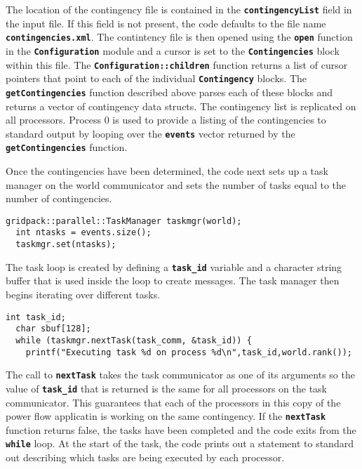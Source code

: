 The location of the contingency file is contained in the
\texttt{\textbf{contingencyList}} field in the input file. If this field is not
present, the code defaults to the file name \texttt{\textbf{contingencies.xml}}.
The contintency file is then opened using the \texttt{\textbf{open}} function in
the \texttt{\textbf{Configuration}} module and a cursor is set to the
\texttt{\textbf{Contingencies}} block within this file. The
\texttt{\textbf{Configuration::children}} function returns a list of cursor pointers that point to each of the individual \texttt{\textbf{Contingency}} blocks. The \texttt{\textbf{getContingencies}} function described above parses each of these blocks and returns a vector of contingency data structs. The contingency list is replicated on all processors. Process 0 is used to provide a listing of the contingencies to standard output by looping over the \texttt{\textbf{events}} vector returned by the \texttt{\textbf{getContingencies}} function.

Once the contingencies have been determined, the code next sets up a task manager on the world communicator and sets the number of tasks equal to the number of contingencies.

{
\color{red}
\begin{Verbatim}[fontseries=b]
  gridpack::parallel::TaskManager taskmgr(world);
  int ntasks = events.size();
  taskmgr.set(ntasks);
\end{Verbatim}
}

The task loop is created by defining a \texttt{\textbf{task\_id}} variable and a character string buffer that is used inside the loop to create messages. The task manager then begins iterating over different tasks.

{
\color{red}
\begin{Verbatim}[fontseries=b]
  int task_id;
  char sbuf[128];
  while (taskmgr.nextTask(task_comm, &task_id)) {
    printf("Executing task %d on process %d\n",task_id,world.rank());
\end{Verbatim}
}

The call to \texttt{\textbf{nextTask}} takes the task communicator as one of its
arguments so the value of \texttt{\textbf{task\_id}} that is returned is the
same for all processors on the task communicator. This guarantees that each of the processors in this copy of the power flow applicatin is working on the same contingency. If the \texttt{\textbf{nextTask}} function returns false, the tasks have been completed and the code exits from the \texttt{\textbf{while}} loop. At the start of the task, the code prints out a statement to standard out describing which tasks are being executed by each processor.

